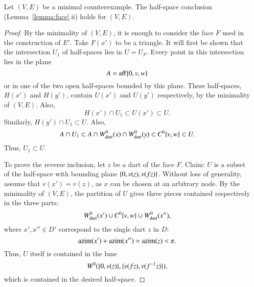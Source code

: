 
\begin{lemma} Let $(V,E)$ be a minimal counterexample.  The half-space conclusion  (Lemma~\ref{lemma:face}.ii) holds for $(V,E)$.
\end{lemma}

\begin{proof}
By the minimality of $(V,E)$, it is enough to consider
the face $F$ used in the construction of $E'$.  Take $F(x')$ to be a triangle.
It will first be shown that the intersection $U_1$ of half-spaces lies in $U=U_F$.
Every point in this intersection lies in the plane
$$
A={\operatorname{aff}}\{0,v,w\}
$$
or in one of the two open half-spaces bounded by this plane.  These half-spaces, $H(x')$ and $H(y')$, 
contain $U(x')$ and $U(y')$ respectively, by the minimality of $(V,E)$.  Also,
$$
H(x')\cap U_1 \subset U(x')\subset U.
$$
Similarly, $H(y')\cap U_1 \subset U$.  Also,
$$
A \cap U_1 \subset A \cap W^0_{\text{dart}}(x) \cap W^0_{\text{dart}}(y) \subset C^0\{v,w\} \subset U.
$$
Thus,
$U_1\subset U$.

To prove the reverse inclusion, let $z$  be a dart of
the face $F$.  Claim: $U$ is a subset of the half-space with bounding
plane $\{0,v(z),v(f z)\}$.  Without loss of generality, assume that $v(x') = v(z)$,
as $x$ can be chosen at an
arbitrary node.  By the minimality of $(V,E)$,  
the partition  of $U$ gives three pieces
contained respectively in the three parts:
$$
W^0_{\text{dart}}(x') \cup C^0\{v,w\} \cup W^0_{\text{dart}}(x''),
$$
where $x',x''\in D'$ correspond to the single dart $z$ in $D$:
$$
{\operatorname{azim}}(x') + {\operatorname{azim}}(x'') = {\operatorname{azim}}(z) < \pi.
$$
Thus, $U$ itself is contained in the lune
$$
W^0(\{0,v(z)\},\{v(f z),v(f^{-1} z)\}),
$$
which is contained in the desired half-space.
\end{proof}

%

